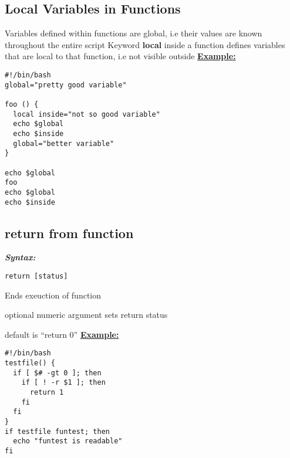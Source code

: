 \documentclass{report}
\begin{document}
\subsection{Local Variables in Functions}
Variables defined within functions are global, i.e their values are known throughout the entire script
\bigbreak \noindent
Keyword \textbf{local} inside a function defines variables that are local to that function, i.e not visible outside
\pagebreak
\bigbreak \noindent
\textbf{\underline{Example:}}
\begin{mdframed}
\begin{verbatim}
#!/bin/bash
global="pretty good variable"

foo () {
  local inside="not so good variable"
  echo $global
  echo $inside
  global="better variable"
}

echo $global
foo
echo $global
echo $inside
\end{verbatim}
\end{mdframed}
\subsection{return from function}
\bigbreak \noindent
\textbf{\textit{Syntax:}}
\begin{verbatim}
return [status]
\end{verbatim}
\bigbreak \noindent
Ends exeuction of function \vspace{1.5mm}

\noindent optional numeric argument sets return status

default is ``return 0''
\bigbreak \noindent
\textbf{\underline{Example:}}
\begin{mdframed}
\begin{verbatim}
#!/bin/bash
testfile() {
  if [ $# -gt 0 ]; then
    if [ ! -r $1 ]; then
      return 1
    fi
  fi
}
if testfile funtest; then
  echo "funtest is readable"
fi
\end{verbatim}
\end{mdframed}
\end{document}
